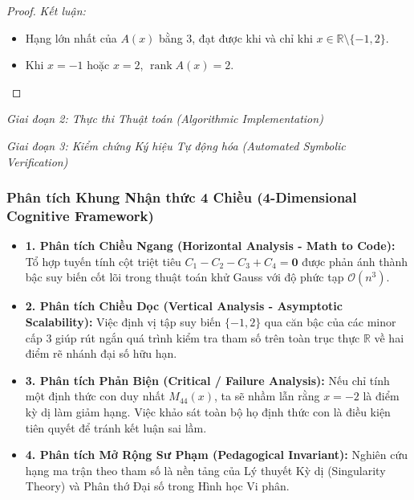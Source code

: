 \documentclass{article}
\begin{document}
\begin{proof}
\emph{Kết luận:}
\begin{itemize}
    \item Hạng lớn nhất của $A(x)$ bằng $3$, đạt được khi và chỉ khi $x \in \mathbb{R} \setminus \{-1, 2\}$.
    \item Khi $x = -1$ hoặc $x = 2$, $\operatorname{rank} A(x) = 2$.
\end{itemize}
\end{proof}

\vspace{0.5em}\noindent\emph{Giai đoạn 2: Thực thi Thuật toán (Algorithmic Implementation)}


\vspace{0.5em}\noindent\emph{Giai đoạn 3: Kiểm chứng Ký hiệu Tự động hóa (Automated Symbolic Verification)}


\subsubsection*{Phân tích Khung Nhận thức 4 Chiều (4-Dimensional Cognitive Framework)}
\begin{itemize}
    \item \textbf{1. Phân tích Chiều Ngang (Horizontal Analysis - Math to Code):} Tổ hợp tuyến tính cột triệt tiêu $C_1 - C_2 - C_3 + C_4 = \mathbf{0}$ được phản ánh thành bậc suy biến cốt lõi trong thuật toán khử Gauss với độ phức tạp $\mathcal{O}(n^3)$.
    \item \textbf{2. Phân tích Chiều Dọc (Vertical Analysis - Asymptotic Scalability):} Việc định vị tập suy biến $\{-1, 2\}$ qua căn bậc của các minor cấp 3 giúp rút ngắn quá trình kiểm tra tham số trên toàn trục thực $\mathbb{R}$ về hai điểm rẽ nhánh đại số hữu hạn.
    \item \textbf{3. Phân tích Phản Biện (Critical / Failure Analysis):} Nếu chỉ tính một định thức con duy nhất $M_{44}(x)$, ta sẽ nhầm lẫn rằng $x = -2$ là điểm kỳ dị làm giảm hạng. Việc khảo sát toàn bộ họ định thức con là điều kiện tiên quyết để tránh kết luận sai lầm.
    \item \textbf{4. Phân tích Mở Rộng Sư Phạm (Pedagogical Invariant):} Nghiên cứu hạng ma trận theo tham số là nền tảng của Lý thuyết Kỳ dị (Singularity Theory) và Phân thớ Đại số trong Hình học Vi phân.
\end{itemize}

\end{document}
